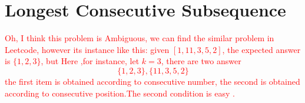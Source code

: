 \section{Longest Consecutive Subsequence}
\textcolor{red}{Oh, I think this problem is Ambiguous,
we can find the similar problem in Leetcode, however its instance like this: given $[1,11,3,5,2]$, the expected answer is $\{1,2,3\}$,	
but Here ,for instance, let $k=3$, there are two answer
\[
	\{1,2,3\}, \{11,3,5,2\}
\]
the first item is obtained according to consecutive number, the second is obtained according to consecutive position.The second condition is easy .
}
